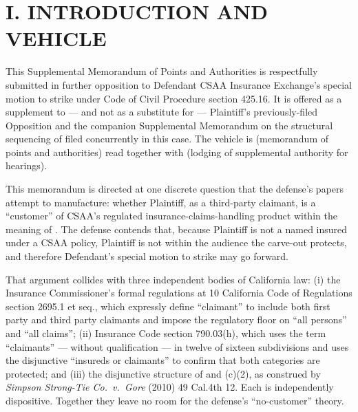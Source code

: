 \newcommand{\docshorttitle}{SUPPL.\ MEMO P\&A --- ``CUSTOMER'' DOCTRINE \S 425.17(c) (CGC-25-631802)}
\newcommand{\doctitleblock}{PLAINTIFF'S SUPPLEMENTAL MEMORANDUM OF POINTS AND AUTHORITIES IN FURTHER OPPOSITION TO DEFENDANT'S SPECIAL MOTION TO STRIKE --- ``CUSTOMER'' DOCTRINE UNDER \S 425.17(c) AND THE THIRD-PARTY CLAIMANT}
\newcommand{\docsubblock}{(Cal.\ Rules of Court, rules 3.1113, 3.1306(c); supplemental to Plaintiff's previously-filed Opposition; cross-noticed for hearings of May 13, 2026 and May 19, 2026, Dept.\ 302)}




\section*{I. INTRODUCTION AND VEHICLE}

This Supplemental Memorandum of Points and Authorities is respectfully submitted in further opposition to Defendant CSAA Insurance Exchange's special motion to strike under Code of Civil Procedure section 425.16. It is offered as a supplement to --- and not as a substitute for --- Plaintiff's previously-filed Opposition and the companion Supplemental Memorandum on the structural sequencing of  filed concurrently in this case. The vehicle is  (memorandum of points and authorities) read together with  (lodging of supplemental authority for hearings).

This memorandum is directed at one discrete question that the defense's papers attempt to manufacture: whether Plaintiff, as a third-party claimant, is a ``customer'' of CSAA's regulated insurance-claims-handling product within the meaning of . The defense contends that, because Plaintiff is not a named insured under a CSAA policy, Plaintiff is not within the audience the carve-out protects, and therefore Defendant's special motion to strike may go forward.

That argument collides with three independent bodies of California law: (i) the Insurance Commissioner's formal regulations at 10 California Code of Regulations section 2695.1 et seq., which expressly define ``claimant'' to include both first party and third party claimants and impose the regulatory floor on ``all persons'' and ``all claims''; (ii) Insurance Code section 790.03(h), which uses the term ``claimants'' --- without qualification --- in twelve of sixteen subdivisions and uses the disjunctive ``insureds or claimants'' to confirm that both categories are protected; and (iii) the disjunctive structure of  and (c)(2), as construed by \textit{Simpson Strong-Tie Co.\ v.\ Gore} (2010) 49 Cal.4th 12. Each is independently dispositive. Together they leave no room for the defense's ``no-customer'' theory.

